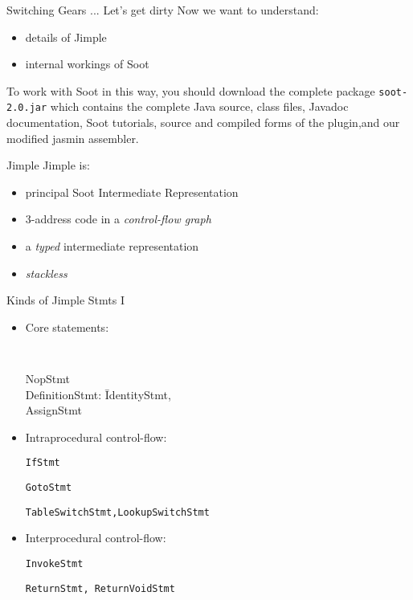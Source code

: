 \begin{slide}{Switching Gears ... Let's get dirty}
Now we want to understand:
\begin{itemize}
\item details of Jimple
\item internal workings of Soot
\end{itemize}

To work with Soot in this way,  you should download the complete package
\texttt{soot-2.0.jar} which contains the complete Java source, class files,
Javadoc documentation, Soot tutorials, source and compiled forms of the plugin,and our modified jasmin assembler. 
\end{slide}

\begin{slide}{Jimple}
Jimple is:
\begin{itemize}
\item principal Soot Intermediate Representation
\item 3-address code in a \emph{control-flow graph}
\item a \emph{typed} intermediate representation
\item \emph{stackless}
\end{itemize}
\end{slide}

\begin{slide}{Kinds of Jimple Stmts I}
\vspace*{-0.1in}
\begin{itemize}
\item Core statements:
\vspace*{-0.1in}
{\tt 
\begin{tabbing}
\quad NopStmt \\
\quad DefinitionStmt: \= IdentityStmt, \\
                \>AssignStmt 
\end{tabbing}}

\vspace*{-0.1in}
\item Intraprocedural control-flow:

{\tt \quad IfStmt}

{\tt \quad GotoStmt}

{\tt \quad TableSwitchStmt,LookupSwitchStmt}

\item Interprocedural control-flow:

{\tt \quad InvokeStmt}

{\tt \quad ReturnStmt, ReturnVoidStmt}

\end{itemize}
\end{slide}

